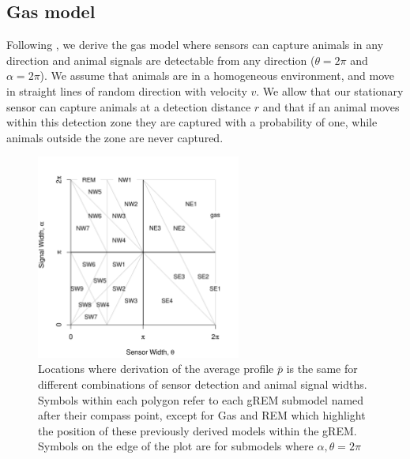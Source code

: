 
\subsection{Gas model} \label{gas}

Following \cite{yapp1956theory}, we derive the gas model where sensors can capture animals in any direction and animal signals are detectable from any direction ($ \theta =  2\pi$ and $ \alpha =  2\pi$). We assume that animals are in a homogeneous environment, and move in straight lines of random direction with velocity $v$. We allow that our stationary sensor can capture animals at a detection distance $r$ and that if an animal moves within this detection zone they are captured with a probability of one, while animals outside the zone are never captured.

\begin{figure}[b]
\centering
\includegraphics[width=0.6\textwidth]{../imgs/lucas_et_al_figure2.pdf}

\caption{Locations where derivation of the average profile $\bar{p}$ is the same for different combinations of sensor detection and animal signal widths. Symbols within each polygon refer to each gREM submodel named after their compass point, except for Gas and REM which highlight the position of these previously derived models within the gREM. Symbols on the edge of the plot are for submodels where $\alpha, \theta = 2\pi$}
\label{f:equalRegions}
\end{figure}



